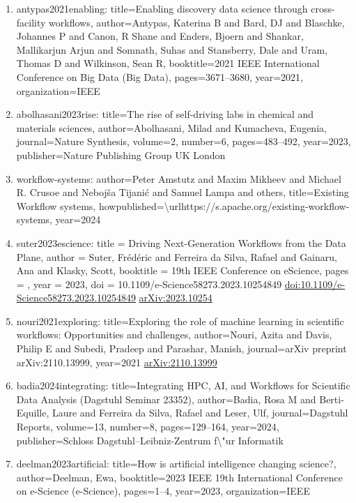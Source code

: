 \documentclass[11pt]{article}
\begin{document}
\begin{enumerate}[leftmargin=*]
  \item antypas2021enabling: title=Enabling discovery data science through cross-facility workflows, author=Antypas, Katerina B and Bard, DJ and Blaschke, Johannes P and Canon, R Shane and Enders, Bjoern and Shankar, Mallikarjun Arjun and Somnath, Suhas and Stansberry, Dale and Uram, Thomas D and Wilkinson, Sean R, booktitle=2021 IEEE International Conference on Big Data (Big Data), pages=3671--3680, year=2021, organization=IEEE
  \item abolhasani2023rise: title=The rise of self-driving labs in chemical and materials sciences, author=Abolhasani, Milad and Kumacheva, Eugenia, journal=Nature Synthesis, volume=2, number=6, pages=483--492, year=2023, publisher=Nature Publishing Group UK London
  \item workflow-systems: author=Peter Amstutz and Maxim Mikheev and Michael R. Crusoe and Nebojša Tijanić and Samuel Lampa and others, title=Existing Workflow systems, howpublished=\textbackslash{}urlhttps://s.apache.org/existing-workflow-systems, year=2024
  \item suter2023escience: title = Driving Next-Generation Workflows from the Data Plane, author = Suter, Frédéric and Ferreira da Silva, Rafael and Gainaru, Ana and Klasky, Scott, booktitle = 19th IEEE Conference on eScience, pages = , year = 2023, doi = 10.1109/e-Science58273.2023.10254849 \href{https://doi.org/10.1109/e-Science58273.2023.10254849}{doi:10.1109/e-Science58273.2023.10254849} \href{https://arxiv.org/abs/2023.10254}{arXiv:2023.10254}
  \item nouri2021exploring: title=Exploring the role of machine learning in scientific workflows: Opportunities and challenges, author=Nouri, Azita and Davis, Philip E and Subedi, Pradeep and Parashar, Manish, journal=arXiv preprint arXiv:2110.13999, year=2021 \href{https://arxiv.org/abs/2110.13999}{arXiv:2110.13999}
  \item badia2024integrating: title=Integrating HPC, AI, and Workflows for Scientific Data Analysis (Dagstuhl Seminar 23352), author=Badia, Rosa M and Berti-Equille, Laure and Ferreira da Silva, Rafael and Leser, Ulf, journal=Dagstuhl Reports, volume=13, number=8, pages=129--164, year=2024, publisher=Schloss Dagstuhl--Leibniz-Zentrum f\textbackslash{}"ur Informatik
  \item deelman2023artificial: title=How is artificial intelligence changing science?, author=Deelman, Ewa, booktitle=2023 IEEE 19th International Conference on e-Science (e-Science), pages=1--4, year=2023, organization=IEEE

\end{enumerate}
\end{document}
